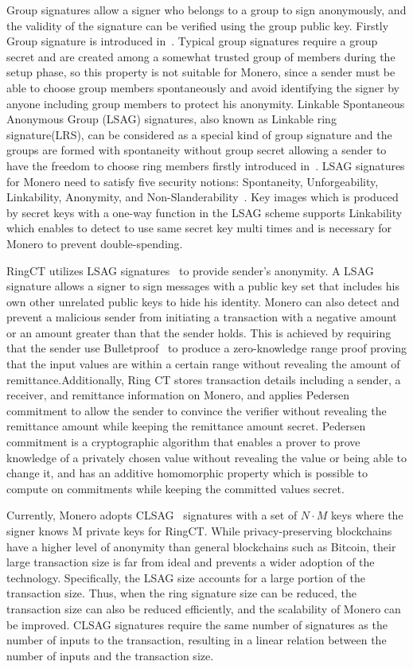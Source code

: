     Group signatures allow a signer who belongs to a group to sign anonymously, and the validity of the signature can be verified using the group public key. Firstly Group signature is introduced in~\cite{ChaumGS}. Typical group signatures require a group secret and are created among a somewhat trusted group of members during the setup phase, so this property is not suitable for Monero, since a sender must be able to choose group members spontaneously and avoid identifying the signer by anyone including group members to protect his anonymity. Linkable Spontaneous Anonymous Group (LSAG) signatures, also known as Linkable ring signature(LRS), can be considered as a special kind of group signature and the groups are formed with spontaneity without group secret allowing a sender to have the freedom to choose ring members firstly introduced in~\cite{LSAG}. LSAG signatures for Monero need to satisfy five security notions: Spontaneity, Unforgeability, Linkability, Anonymity, and Non-Slanderability~\cite{Non-Slanderability}. Key images which is produced by secret keys with a one-way function in the LSAG scheme supports Linkability which enables to detect to use same secret key multi times and is necessary for Monero to prevent double-spending.
    
    RingCT utilizes LSAG signatures~\cite{Linkable-ring-signature} to provide sender's anonymity. A LSAG signature allows a signer to sign messages with a public key set that includes his own other unrelated public keys to hide his identity. Monero can also detect and prevent a malicious sender from initiating a transaction with a negative amount or an amount greater than that the sender holds. This is achieved by requiring that the sender use Bulletproof~\cite{Bulletproofs} to produce a zero-knowledge range proof proving that the input values are within a certain range without revealing the amount of remittance.Additionally, Ring CT stores transaction details including a sender, a receiver, and remittance information on Monero, and applies Pedersen commitment to allow the sender to convince the verifier without revealing the remittance amount while keeping the remittance amount secret. Pedersen commitment is a cryptographic algorithm that enables a prover to prove knowledge of a privately chosen value without revealing the value or being able to change it, and has an additive homomorphic property which is possible to compute on commitments while keeping the committed values secret.

    Currently, Monero adopts CLSAG~\cite{clsag} signatures with a set of $N\cdot M$ keys where the signer knows M private keys for RingCT. While privacy-preserving blockchains have a higher level of anonymity than general blockchains such as Bitcoin, their large transaction size is far from ideal and prevents a wider adoption of the technology. Specifically, the LSAG size accounts for a large portion of the transaction size. Thus, when the ring signature size can be reduced, the transaction size can also be reduced efficiently, and the scalability of Monero can be improved. CLSAG signatures require the same number of signatures as the number of inputs to the transaction, resulting in a linear relation between the number of inputs and the transaction size.
    
